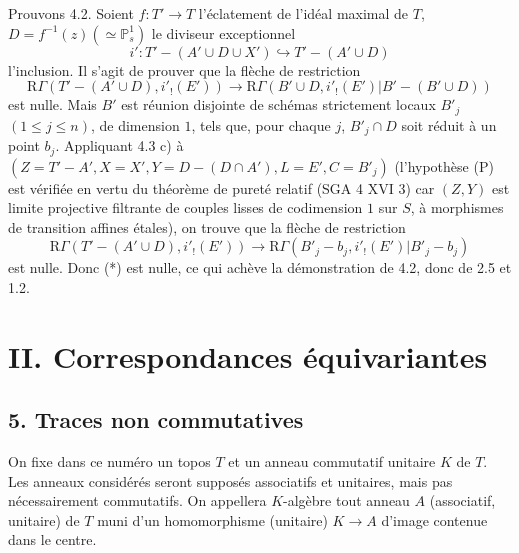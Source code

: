 \documentclass[11pt]{article}
\begin{document}
Prouvons 4.2. Soient $f:T'\to T$ l'éclatement de l'idéal maximal de $T$, $D=f^{-1}(z)(\simeq\mathbb P^1_s)$ le diviseur exceptionnel%
\[
i':T'-(A'\cup D\cup X')\hookrightarrow T'-(A'\cup D)
\]
l'inclusion. Il s'agit de prouver que la flèche de restriction
\begin{equation}
\mathrm R\Gamma(T'-(A'\cup D),i'_!(E'))
\longrightarrow
\mathrm R\Gamma(B'\cup D,i'_!(E')|B'-(B'\cup D))
\tag{*}
\end{equation}
est nulle. Mais $B'$ est réunion disjointe de schémas strictement locaux $B'_j$ $(1\le j\le n)$, de dimension $1$, tels que, pour chaque $j$, $B'_j\cap D$ soit réduit à un point $b_j$. Appliquant 4.3 c) à $(Z=T'-A', X=X', Y=D-(D\cap A'), L=E', C=B'_j)$ (l'hypothèse (P) est vérifiée en vertu du théorème de pureté relatif (SGA 4 XVI 3) car $(Z,Y)$ est limite projective filtrante de couples lisses de codimension $1$ sur $S$, à morphismes de transition affines étales), on trouve que la flèche de restriction
\[
\mathrm R\Gamma(T'-(A'\cup D),i'_!(E'))
\longrightarrow
\mathrm R\Gamma(B'_j-b_j,i'_!(E')|B'_j-b_j)
\]
est nulle. Donc (*) est nulle, ce qui achève la démonstration de 4.2, donc de 2.5 et 1.2.

\section*{II. Correspondances équivariantes}

\subsection*{5. Traces non commutatives}

On fixe dans ce numéro un topos $T$ et un anneau commutatif unitaire $K$ de $T$. Les anneaux considérés seront supposés associatifs et unitaires, mais pas nécessairement commutatifs. On appellera $K$-algèbre tout anneau $A$ (associatif, unitaire) de $T$ muni d'un homomorphisme (unitaire) $K\to A$ d'image contenue dans le centre.
\end{document}
